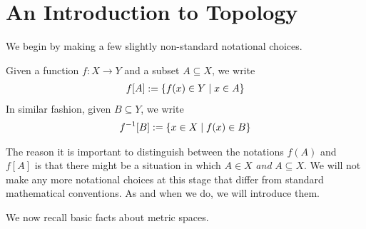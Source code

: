 \chapter{An Introduction to Topology} \label{Ch1:CH}
\thispagestyle{empty}

We begin by making a few slightly non-standard notational choices.

\begin{boxnotation}
    Given a function $f : X \to Y$ and a subset $A \subseteq X$, we write
    \begin{align*}
        f[A] := \left\{ f(x) \in Y \; \middle\vert \; x \in A \right\}
    \end{align*}
    In similar fashion, given $B \subseteq Y$, we write
    \begin{align*}
        f^{-1}[B] := \left\{ x \in X \; \middle\vert \; f(x) \in B \right\}
    \end{align*}
\end{boxnotation}

The reason it is important to distinguish between the notations $f(A)$ and $f[A]$ is that there might be a situation in which $A \in X$ \textit{and} $A \subseteq X$. %
We will not make any more notational choices at this stage that differ from standard mathematical conventions. As and when we do, we will introduce them.

We now recall basic facts about metric spaces.


